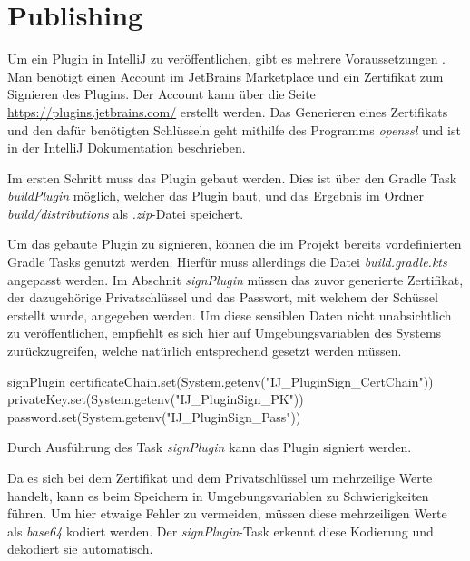 \section{Publishing}
\label{sec:EntwicklungIntelliJ_Publishing}

Um ein Plugin in IntelliJ zu veröffentlichen, gibt es mehrere Voraussetzungen
\cite{IntelliJPlatformSDKPluginSigning}.
Man benötigt einen Account im JetBrains Marketplace und ein Zertifikat
zum Signieren des Plugins. Der Account kann über die Seite 
\url{https://plugins.jetbrains.com/} erstellt werden. Das Generieren eines
Zertifikats und den dafür benötigten Schlüsseln geht mithilfe des 
Programms \emph{openssl} und ist in der IntelliJ Dokumentation beschrieben.

Im ersten Schritt muss das Plugin gebaut werden. Dies ist über den
Gradle Task \emph{buildPlugin} möglich, welcher das Plugin baut, und
das Ergebnis im Ordner \emph{build/distributions} als \emph{.zip}-Datei
speichert.

Um das gebaute Plugin zu signieren, können die im Projekt bereits vordefinierten
Gradle Tasks genutzt werden. Hierfür muss allerdings die Datei 
\emph{build.gradle.kts} angepasst werden. Im Abschnit \emph{signPlugin}
müssen das zuvor generierte Zertifikat, der dazugehörige Privatschlüssel
und das Passwort, mit welchem der Schüssel erstellt wurde, angegeben werden.
Um diese sensiblen Daten nicht unabsichtlich zu veröffentlichen, empfiehlt
es sich hier auf Umgebungsvariablen des Systems zurückzugreifen, welche
natürlich entsprechend gesetzt werden müssen.
\begin{JsCode}[numbers=none]
    signPlugin {
        certificateChain.set(System.getenv("IJ_PluginSign_CertChain"))
        privateKey.set(System.getenv("IJ_PluginSign_PK"))
        password.set(System.getenv("IJ_PluginSign_Pass"))
    }
\end{JsCode}
Durch Ausführung des Task \emph{signPlugin} kann das Plugin signiert werden. 

Da es sich bei dem Zertifikat und dem Privatschlüssel um mehrzeilige
Werte handelt, kann es beim Speichern in Umgebungsvariablen
zu Schwierigkeiten führen.
Um hier etwaige Fehler zu vermeiden, müssen diese mehrzeiligen
Werte als \emph{base64} kodiert werden. Der \emph{signPlugin}-Task
erkennt diese Kodierung und dekodiert sie automatisch.

